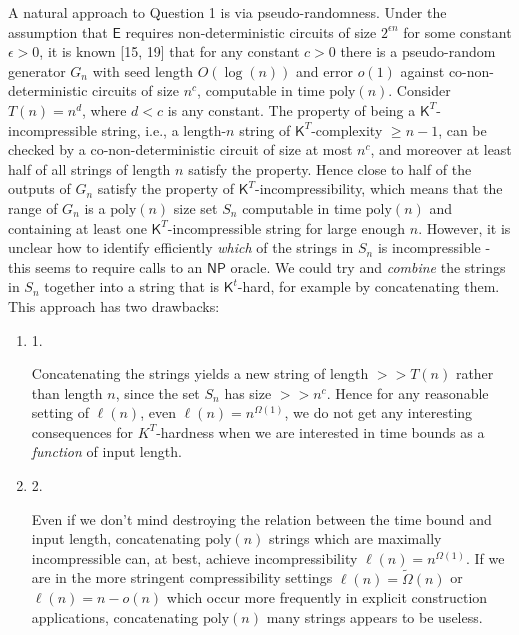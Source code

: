 \documentclass[10pt,a4paper]{article}
\begin{document}
A natural approach to Question 1 is via pseudo-randomness. Under the assumption that ${\mathsf{E}}$ requires non-deterministic circuits of size $2^{\epsilon n}$ for some constant $\epsilon>0$, it is known [15, 19] that for any constant $c>0$ there is a pseudo-random generator $G_{n}$ with seed length $O(\log(n))$ and error $o(1)$ against co-non-deterministic circuits of size $n^{c}$, computable in time $\mathrm{poly}(n)$. Consider $T(n)=n^{d}$, where $d<c$ is any constant. The property of being a ${\mathsf{K}}^{T}$-incompressible string, i.e., a length-$n$ string of ${\mathsf{K}}^{T}$-complexity $\geq n-1$, can be checked by a co-non-deterministic circuit of size at most $n^{c}$, and moreover at least half of all strings of length $n$ satisfy the property. Hence close to half of the outputs of $G_{n}$ satisfy the property of ${\mathsf{K}}^{T}$-incompressibility, which means that the range of $G_{n}$ is a $\mathrm{poly}(n)$ size set $S_{n}$ computable in time $\mathrm{poly}(n)$ and containing at least one ${\mathsf{K}}^{T}$-incompressible string for large enough $n$. However, it is unclear how to identify efficiently \emph{which} of the strings in $S_{n}$ is incompressible - this seems to require calls to an ${\mathsf{NP}}$ oracle. We could try and \emph{combine} the strings in $S_{n}$ together into a string that is ${\mathsf{K}}^{t}$-hard, for example by concatenating them. This approach has two drawbacks:\par


\begin{enumerate}


\item[] 
1. 


Concatenating the strings yields a new string of length $>>T(n)$ rather than length $n$, since the set $S_{n}$ has size $>>n^{c}$. Hence for any reasonable setting of $\ell(n)$, even $\ell(n)=n^{\Omega(1)}$, we do not get any interesting consequences for $K^{T}$-hardness when we are interested in time bounds as a \emph{function} of input length.\par





\item[] 
2. 


Even if we don’t mind destroying the relation between the time bound and input length, concatenating $\mathrm{poly}(n)$ strings which are maximally incompressible can, at best, achieve incompressibility $\ell(n)=n^{\Omega(1)}$. If we are in the more stringent compressibility settings $\ell(n)=\tilde{\Omega}(n)$ or $\ell(n)=n-o(n)$ which occur more frequently in explicit construction applications, concatenating $\mathrm{poly}(n)$ many strings appears to be useless.\par





\end{enumerate}
\end{document}
